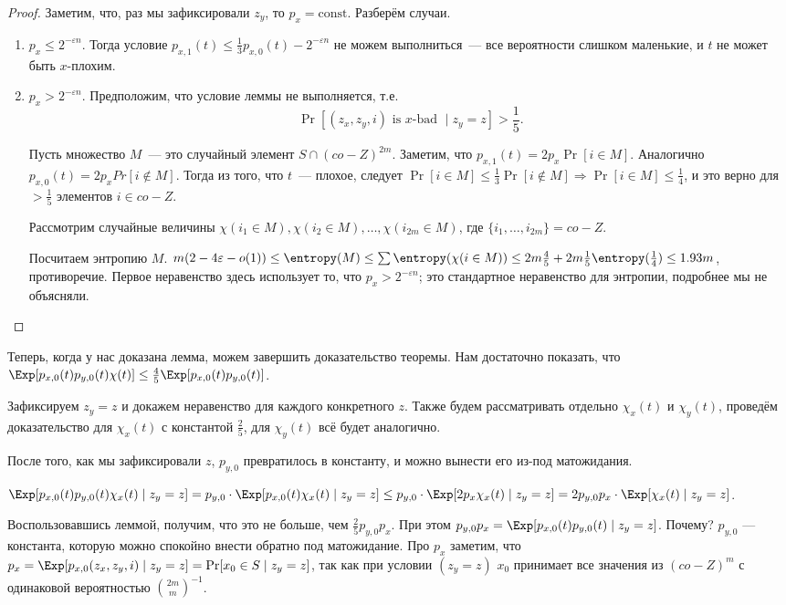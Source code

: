 \begin{proof}
    Заметим, что, раз мы зафиксировали $z_y$, то $p_x = \mathrm{const}$. Разберём случаи.

    \begin{enumerate}
        \item $p_x \leq 2^{-\varepsilon n}$. Тогда условие $p_{x, 1}(t) \leq \frac{1}{3}p_{x, 0}(t) -
            2^{-\varepsilon n}$ не можем выполниться~--- все вероятности слишком маленькие, и $t$ не
            может быть $x$-плохим.
        \item $p_x > 2^{-\varepsilon n}$. Предположим, что условие леммы не выполняется, т.е.
            $$
                \Pr[(z_x, z_y, i) \text{ is } x\text{-bad } \mid z_y = z] > \frac{1}{5}.
            $$

            Пусть множество $M$~--- это случайный элемент $S \cap (co-Z)^{2m}$. Заметим, что $p_{x, 1}(t)
            = 2 p_x \Pr[i \in M]$. Аналогично $p_{x, 0}(t) = 2 p_x Pr[i \notin M]$. Тогда из того, что
            $t$~--- плохое, следует $\Pr[i \in M] \le \frac{1}{3} \Pr[i \notin M] \Rightarrow \Pr[i \in
            M] \le \frac{1}{4}$, и это верно для $> \frac{1}{5}$ элементов $i \in co-Z$.

            Рассмотрим случайные величины $\chi(i_1 \in M), \chi(i_2 \in M), \ldots, \chi(i_{2m} \in M)$,
            где $\{i_1, \ldots, i_{2m}\} = co-Z$.

            Посчитаем энтропию $M$. $m(2 - 4\varepsilon - o(1)) \le \entropy(M) \le \sum \entropy(\chi(i
            \in M)) \le 2m \frac{4}{5} + 2m \frac{1}{5} \entropy(\frac{1}{4}) \le 1.93m$,
            противоречие. Первое неравенство здесь использует то, что $p_x > 2^{-\varepsilon n}$; это
            стандартное неравенство для энтропии, подробнее мы не объясняли.
    \end{enumerate}
\end{proof}

Теперь, когда у нас доказана лемма, можем завершить доказательство теоремы. Нам достаточно показать, что
$\Exp[p_{x, 0}(t) p_{y, 0}(t) \chi(t)] \le \frac{4}{5}\Exp[p_{x, 0}(t)p_{y, 0}(t)]$. 

Зафиксируем $z_y = z$ и докажем неравенство для каждого конкретного $z$. Также будем рассматривать
отдельно $\chi_x(t)$ и $\chi_y(t)$, проведём доказательство для $\chi_x(t)$ с константой $\frac{2}{5}$,
для $\chi_y(t)$ всё будет аналогично.

После того, как мы зафиксировали $z$, $p_{y, 0}$ превратилось в константу, и можно вынести его из-под
матожидания.

$\Exp[p_{x, 0}(t)p_{y, 0}(t)\chi_x(t) \mid z_y = z] = p_{y, 0} \cdot \Exp[p_{x, 0}(t) \chi_x(t) \mid z_y
= z] \le p_{y, 0} \cdot \Exp[2p_{x} \chi_x(t) \mid z_y = z] = 2p_{y, 0}p_x \cdot \Exp[\chi_x(t) \mid z_y
= z]$.

Воспользовавшись леммой, получим, что это не больше, чем $\frac{2}{5} p_{y, 0}p_x$. При этом $p_{y, 0}p_x
= \Exp[p_{x, 0}(t)p_{y, 0}(t) \mid z_y = z]$. Почему? $p_{y, 0}$ --- константа, которую можно спокойно
внести обратно под матожидание. Про $p_x$ заметим, что $p_x = \Exp[p_{x, 0}(z_x, z_y, i) \mid z_y = z] =
\Pr[x_0 \in S \mid z_y = z]$, так как при условии $(z_y = z)$ $x_0$ принимает все значения из $(co-Z)^m$
с одинаковой вероятностью $\binom{2m}{m}^{-1}$.